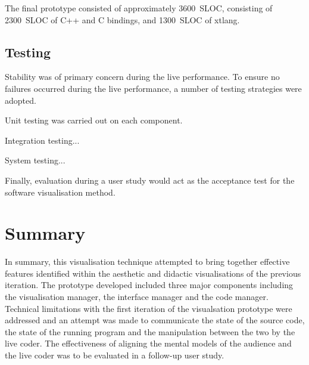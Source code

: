 The final prototype consisted of approximately 3600~\ac{SLOC}, consisting of 2300~\ac{SLOC} of C++ and C bindings, and 1300~\ac{SLOC} of xtlang.

\subsection{Testing}

Stability was of primary concern during the live performance. To ensure no failures occurred during the live performance, a number of testing strategies were adopted. \more

Unit testing was carried out on each component.

Integration testing... \more

System testing... \more

Finally, evaluation during a user study would act as the acceptance test for the software visualisation method.

\section{Summary}

In summary, this visualisation technique attempted to bring together effective features identified within the aesthetic and didactic visualisations of the previous iteration. The prototype developed included three major components including the visualisation manager, the interface manager and the code manager. Technical limitations with the first iteration of the visualsation prototype were addressed and an attempt was made to communicate the state of the source code, the state of the running program and the manipulation between the two by the live coder. The effectiveness of aligning the mental models of the audience and the live coder was to be evaluated in a follow-up user study.



